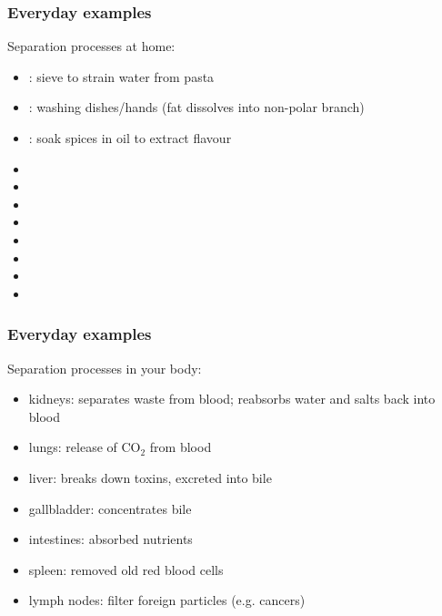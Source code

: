 \begin{frame}\frametitle{Everyday examples}
	Separation processes at home:
	\begin{itemize}
		\item	{\color{myGreen}{screening}}: sieve to strain water from pasta
		\item	{\color{myGreen}{absorption}}: washing dishes/hands (fat dissolves into non-polar branch)
		\item	{\color{myGreen}{liquid/liquid extraction}}: soak spices in oil to extract flavour 
		\item	\iftoggle{instructor}{\href{https://www.youtube.com/watch?v=uQTGKLbh9X4}{{\color{myGreen}{cyclone:}} vacuum cleaner}}{\href{https://www.youtube.com/watch?v=uQTGKLbh9X4}{cyclone:}}
		\item	\iftoggle{instructor}{{\color{myGreen}{filtering}}: vacuum cleaner; furnace filter}{{\color{myGreen}{filter}}:}		
		\item	\iftoggle{instructor}{{\color{myGreen}{leaching}}: coffee/espresso maker}{{\color{myGreen}{leaching}}:} %
		\item	\iftoggle{instructor}{{\color{myGreen}{leaching}}: making tea}{{\color{myGreen}{leaching}}:}
		\item	\iftoggle{instructor}{{\color{myGreen}{adsorption}}: water filter}{{\color{myGreen}{adsorption}}:}
		\item	\iftoggle{instructor}{{\color{myGreen}{centrifugation}}: clothes washing machine}{{\color{myGreen}{centrifugation}}:}
		\item	\iftoggle{instructor}{{\color{myGreen}{phase change by heat addition}}: clothes drier}{{\color{myGreen}{phase change by heat addition}}:}
		\item	\iftoggle{instructor}{{\color{myGreen}{phase change by heat removal}}: dehumidifier}{{\color{myGreen}{phase change by heat removal}}:}
	\end{itemize}
\end{frame}
	
\begin{frame}\frametitle{Everyday examples}
	Separation processes in your body:
	\begin{itemize}
		\item	kidneys: separates waste from blood; reabsorbs water and salts back into blood
		\item	lungs: release of $\text{CO}_2$ from blood
		\item	liver: breaks down toxins, excreted into bile
		\item	gallbladder: concentrates bile
		\item	intestines: absorbed nutrients
		\item	spleen: removed old red blood cells
		\item	lymph nodes: filter foreign particles (e.g. cancers)
	\end{itemize}
\end{frame}

